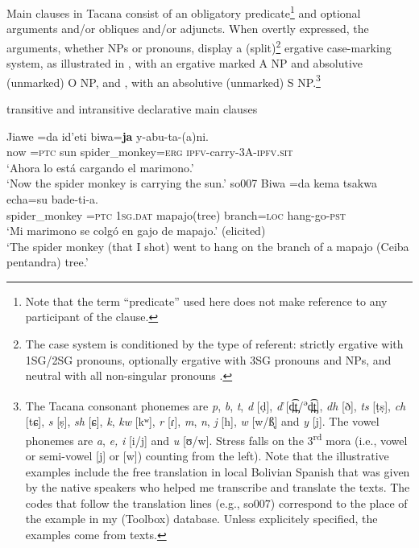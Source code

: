 \documentclass[output=paper]{langsci/langscibook}
\begin{document}
Main clauses in Tacana consist of an obligatory predicate\footnote{Note that the term ``predicate'' used here does not make
    reference to any participant of the clause.} 
and optional arguments and\slash or obliques
and\slash or adjuncts. When overtly expressed, the arguments, whether NPs
or pronouns, display a (split)\footnote{The case system is conditioned by the type of referent:
    strictly ergative with 1SG\slash 2SG pronouns, optionally ergative
    with 3SG pronouns and NPs, and neutral with all non-singular
    pronouns \parencites{Guillaume2016b}{Guillaume-forthcoming}.} 
ergative case-marking system, as illustrated in , with an ergative
marked A NP and absolutive (unmarked) O NP, and
, with an
absolutive (unmarked) S NP.\footnote{\label{fn:tacana-phonemes}The Tacana consonant phonemes are
\textit{p}, \textit{b}, \textit{t}, \textit{d} [ḍ], \textit{ď}
[d̪͡t̪/\textsuperscript{ə}d̪͡t̪], \textit{dh}
[ð], \textit{ts} [ṭṣ], \textit{ch} [tɕ],
\textit{s} [ṣ], \textit{sh} [ɕ], \textit{k}, \textit{kw}
[kʷ], \textit{r} [ɾ], \textit{m}, \textit{n},
\textit{j} [h], \textit{w} [w/ß̞] and \textit{y} [j]. The vowel
phonemes are \textit{a}, \textit{e,} \textit{i} [i/j] and \textit{u}
[ʊ/w]. Stress falls on the 3\textsuperscript{rd} mora (i.e., vowel
or semi-vowel [j] or [w]) counting from the left). Note that the
illustrative examples include the free translation in local Bolivian
Spanish that was given by the native speakers who helped me transcribe and
translate the texts. The codes that follow the translation lines (e.g.,
so007) correspond to the place of the example in my (Toolbox) database.
Unless explicitely specified, the examples come from texts.}

\begin{exe}\ex\label{ex:tacana-monkey-sun-branch} transitive and intransitive declarative main clauses
    \begin{xlist}
    \ex\label{ex:tacana-monkey-sun}
    \gll Jiawe	=da	id'eti	biwa=\textbf{ja}	y-abu-ta-(a)ni.\\
    now	=\textsc{ptc}	sun	spider\_monkey=\textsc{erg}	\textsc{ipfv}-carry-3A-\textsc{ipfv.sit}\\
    \glt `Ahora lo está cargando el marimono.'\\
    `Now the spider monkey is carrying the sun.’ so007
    \ex\label{ex:tacana-monkey-branch}
    \gll {}Biwa	=da	kema	{\ob}tsakwa	echa=su{\cb}	bade-ti-a.\\
    spider\_monkey	=\textsc{ptc}	\textsc{1sg.dat}	mapajo(tree)	branch=\textsc{loc}	hang-go-\textsc{pst}\\
    \glt ‘Mi marimono se colgó en gajo de mapajo.’ (elicited)\\
    ‘The spider monkey (that I shot) went to hang on the branch of a mapajo (Ceiba pentandra) tree.’
    \end{xlist}\end{exe}
\end{document}
